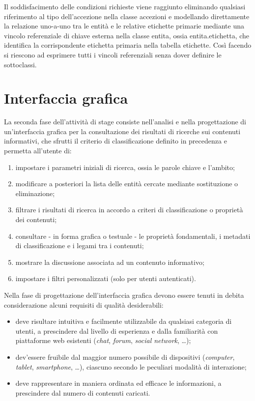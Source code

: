 Il soddisfacimento delle condizioni richieste viene raggiunto eliminando qualsiasi riferimento al tipo dell'accezione nella classe \textsf{accezioni} e modellando direttamente la relazione uno-a-uno tra le entità e le relative etichette primarie mediante una vincolo referenziale di chiave esterna nella classe \textsf{entita}, ossia \textsf{entita.etichetta}, che identifica la corrispondente etichetta primaria nella tabella \textsf{etichette}. Così facendo si riescono ad esprimere tutti i vincoli referenziali senza dover definire le sottoclassi.

\section{Interfaccia grafica}
\label{sec:tesi:stage:gui}
La seconda fase dell'attività di stage consiste nell'analisi e nella progettazione di un'interfaccia grafica per la consultazione dei risultati di ricerche sui contenuti informativi, che sfrutti il criterio di classificazione definito in precedenza e permetta all'utente di:
\begin{enumerate}
	\item impostare i parametri iniziali di ricerca, ossia le parole chiave e l'ambito;
	\item modificare a posteriori la lista delle entità cercate mediante sostituzione o eliminazione;
	\item filtrare i risultati di ricerca in accordo a criteri di classificazione o proprietà dei contenuti;
	\item consultare - in forma grafica o testuale - le proprietà fondamentali, i metadati di classificazione e i legami tra i contenuti;
	\item mostrare la discussione associata ad un contenuto informativo;
	\item impostare i filtri personalizzati (solo per utenti autenticati).
\end{enumerate}

Nella fase di progettazione dell'interfaccia grafica devono essere tenuti in debita considerazione alcuni requisiti di qualità desiderabili:
\begin{itemize}
  \item deve risultare intuitiva e facilmente utilizzabile da qualsiasi categoria di utenti, a prescindere dal livello di esperienza e dalla familiarità con piattaforme web esistenti (\textit{chat}, \textit{forum}, \textit{social network}, \ldots);
  \item dev'essere fruibile dal maggior numero possibile di dispositivi (\textit{computer}, \textit{tablet}, \textit{smartphone}, \ldots), ciascuno secondo le peculiari modalità di interazione;
  \item deve rappresentare in maniera ordinata ed efficace le informazioni, a prescindere dal numero di contenuti caricati.
\end{itemize}
 
